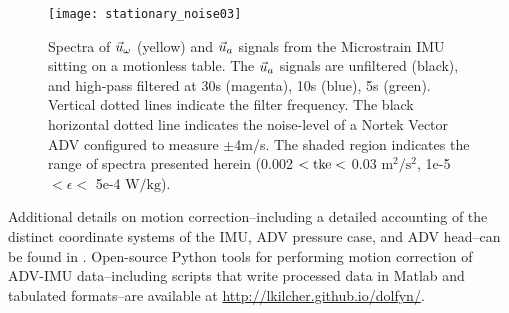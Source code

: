 
\begin{figure}
  \centering
  \label{fig:stationary_noise}
  \texttt{[image: stationary\_noise03]}
  \caption{Spectra of $\urot$ (yellow) and $\uacc$ signals from the Microstrain IMU sitting on a motionless table. The $\uacc$ signals are unfiltered (black), and high-pass filtered at 30s (magenta), 10s (blue), 5s (green). Vertical dotted lines indicate the filter frequency. The black horizontal dotted line indicates the noise-level of a Nortek Vector ADV configured to measure $\pm$4m/s. The shaded region indicates the range of spectra presented herein (0.002 $< \mathrm{tke} <$ 0.03 $\mathrm{m^2/s^2}$, 1e-5 $< \epsilon <$ 5e-4 $\mathrm{W/kg}$).}
\end{figure}

Additional details on motion correction--including a detailed accounting of the distinct coordinate systems of the IMU, ADV pressure case, and ADV head--can be found in \cite{Kilcher++2016}. Open-source Python tools for performing motion correction of ADV-IMU data--including scripts that write processed data in Matlab and tabulated formats--are available at \url{http://lkilcher.github.io/dolfyn/}.

\def\ue{\ensuremath{\vec{u}\earth}}

